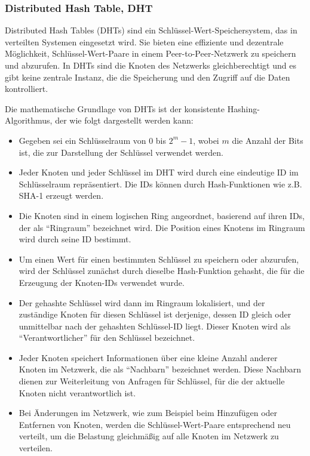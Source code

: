 \documentclass[../vs-script-first-v01.tex]{subfiles}
\begin{document}
\subsubsection{Distributed Hash Table, DHT}

Distributed Hash Tables (DHTs) sind ein Schlüssel-Wert-Speichersystem, das in verteilten Systemen eingesetzt wird. Sie bieten eine effiziente und dezentrale Möglichkeit, Schlüssel-Wert-Paare in einem Peer-to-Peer-Netzwerk zu speichern und abzurufen. In DHTs sind die Knoten des Netzwerks gleichberechtigt und es gibt keine zentrale Instanz, die die Speicherung und den Zugriff auf die Daten kontrolliert.

Die mathematische Grundlage von DHTs ist der konsistente Hashing-Algorithmus, der wie folgt dargestellt werden kann:

\begin{itemize}
\item Gegeben sei ein Schlüsselraum von $0$ bis $2^m - 1$, wobei $m$ die Anzahl der Bits ist, die zur Darstellung der Schlüssel verwendet werden.
\item Jeder Knoten und jeder Schlüssel im DHT wird durch eine eindeutige ID im Schlüsselraum repräsentiert. Die IDs können durch Hash-Funktionen wie z.B. SHA-1 erzeugt werden.
\item Die Knoten sind in einem logischen Ring angeordnet, basierend auf ihren IDs, der als \enquote{Ringraum} bezeichnet wird. Die Position eines Knotens im Ringraum wird durch seine ID bestimmt.
\item Um einen Wert für einen bestimmten Schlüssel zu speichern oder abzurufen, wird der Schlüssel zunächst durch dieselbe Hash-Funktion gehasht, die für die Erzeugung der Knoten-IDs verwendet wurde.
\item Der gehashte Schlüssel wird dann im Ringraum lokalisiert, und der zuständige Knoten für diesen Schlüssel ist derjenige, dessen ID gleich oder unmittelbar nach der gehashten Schlüssel-ID liegt. Dieser Knoten wird als \enquote{Verantwortlicher} für den Schlüssel bezeichnet.
\item Jeder Knoten speichert Informationen über eine kleine Anzahl anderer Knoten im Netzwerk, die als \enquote{Nachbarn} bezeichnet werden. Diese Nachbarn dienen zur Weiterleitung von Anfragen für Schlüssel, für die der aktuelle Knoten nicht verantwortlich ist.
\item Bei Änderungen im Netzwerk, wie zum Beispiel beim Hinzufügen oder Entfernen von Knoten, werden die Schlüssel-Wert-Paare entsprechend neu verteilt, um die Belastung gleichmäßig auf alle Knoten im Netzwerk zu verteilen.
\end{itemize}
\end{document}
